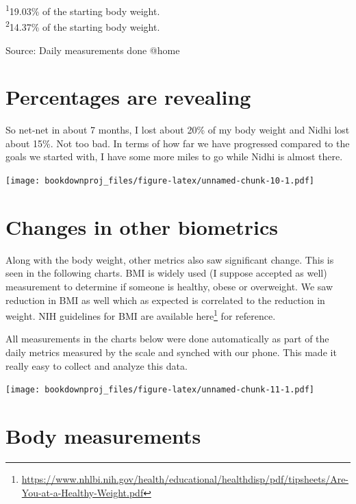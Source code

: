 \documentclass[oneside]{book}
\renewcommand{\href}[2]{#2\footnote{\url{#1}}}
\begin{document}
\vspace{-5mm}

\begin{minipage}{\linewidth}
\textsuperscript{1}19.03\% of the starting body weight. \\ 
\textsuperscript{2}14.37\% of the starting body weight. \\ 
\end{minipage}\begin{minipage}{\linewidth}
Source: Daily measurements done @home\\ 
\end{minipage}

\section{Percentages are revealing}\label{percentages-are-revealing}

So net-net in about 7 months, I lost about 20\% of my body weight and
Nidhi lost about 15\%. Not too bad. In terms of how far we have
progressed compared to the goals we started with, I have some more miles
to go while Nidhi is almost there.

\texttt{[image: bookdownproj\_files/figure-latex/unnamed-chunk-10-1.pdf]}

\section{Changes in other biometrics}\label{changes-in-other-biometrics}

Along with the body weight, other metrics also saw significant change.
This is seen in the following charts. BMI is widely used (I suppose
accepted as well) measurement to determine if someone is healthy, obese
or overweight. We saw reduction in BMI as well which as expected is
correlated to the reduction in weight. NIH guidelines for BMI are
available
\href{https://www.nhlbi.nih.gov/health/educational/healthdisp/pdf/tipsheets/Are-You-at-a-Healthy-Weight.pdf}{here}
for reference.

All measurements in the charts below were done automatically as part of
the daily metrics measured by the scale and synched with our phone. This
made it really easy to collect and analyze this data.

\texttt{[image: bookdownproj\_files/figure-latex/unnamed-chunk-11-1.pdf]}

\section{Body measurements}\label{body-measurements}
\end{document}
